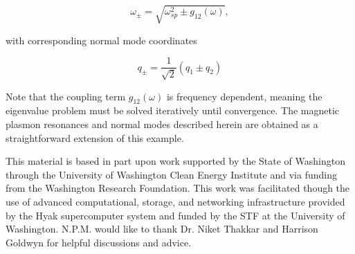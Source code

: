 \documentclass[journal=apchd5,manuscript=article]{achemso}
\begin{document}
\begin{equation}
\omega_{\pm} = \sqrt{\omega_{sp}^2 \pm g_{12}(\omega)},
\label{eigenvalues}
\end{equation}

\noindent with corresponding normal mode coordinates

\begin{equation}
q_{\pm} = \frac{1}{\sqrt{2}}\left(q_1 \pm q_2\right)
\label{eigenvectors}
\end{equation}

\noindent Note that the coupling term $g_{12}(\omega)$ is frequency dependent, meaning the eigenvalue problem must be solved iteratively until convergence. The magnetic plasmon resonances and normal modes described herein are obtained as a straightforward extension of this example.

\begin{acknowledgement}
This material is based in part upon work supported by the State of Washington through the University of Washington Clean Energy Institute and via funding from the Washington Research Foundation. This work was facilitated though the use of advanced computational, storage, and networking infrastructure provided by the Hyak supercomputer system and funded by the STF at the University of Washington. N.P.M. would like to thank Dr. Niket Thakkar and Harrison Goldwyn for helpful discussions and advice.
\end{acknowledgement}


\end{document}
